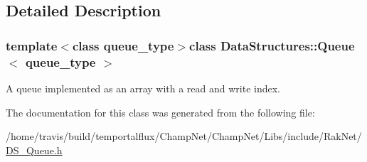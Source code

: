 \subsection{Detailed Description}
\subsubsection*{template$<$class queue\-\_\-type$>$class Data\-Structures\-::\-Queue$<$ queue\-\_\-type $>$}

A queue implemented as an array with a read and write index. 

The documentation for this class was generated from the following file\-:\begin{DoxyCompactItemize}
\item 
/home/travis/build/temportalflux/\-Champ\-Net/\-Champ\-Net/\-Libs/include/\-Rak\-Net/\hyperlink{_d_s___queue_8h}{D\-S\-\_\-\-Queue.\-h}\end{DoxyCompactItemize}
